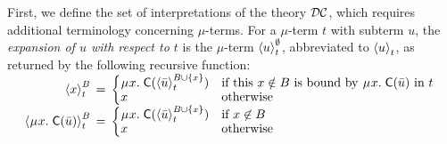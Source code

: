 First, we define the set of interpretations of the theory $\thD$,
which requires additional terminology concerning $\mu$-terms.
For a $\mu$-term $t$ with subterm $u$,
the \emph{expansion of $u$ with respect to $t$} is the $\mu$-term $\interp{t}{u}^\emptyset$,
abbreviated to
$\interp{t}{u}$, as returned by the following recursive function:
\[\begin{array}{r@{}c@{}l}
\interp{t}{x}^B & {} \,=\, {} &
\textstyle\smash{\begin{cases}
    \MU x.\; \const{C}( \interp{t}{ \vec u}^{\smash{B \mathrel\cup \{ x \}}}) & \text{if this $x \notin B$ is
    bound by $\MU x.\; \const{C}( \vec u )$ in $t$}  \\[-\jot]
    x & \text{otherwise}
\end{cases}} ~ \\[1.5ex] %
\interp{t}{\MU x.\; \const{C}( \vec u )}^B & = &
\textstyle\begin{cases}
    \MU x.\; \const{C}( \interp{t}{ \vec u }^{\smash{B \mathrel\cup \{ x \}}} ) & \text{if }x \not\in B \\[-\jot]
    x & \text{otherwise}
\end{cases}
\end{array}\]

